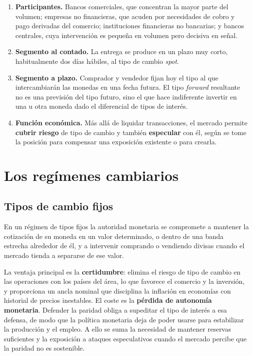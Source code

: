 \begin{enumerate}
    \item \textbf{Participantes.} Bancos comerciales, que concentran la mayor
    parte del volumen; empresas no financieras, que acuden por necesidades de
    cobro y pago derivadas del comercio; instituciones financieras no bancarias;
    y bancos centrales, cuya intervención es pequeña en volumen pero decisiva en
    señal.
    \item \textbf{Segmento al contado.} La entrega se produce en un plazo muy
    corto, habitualmente dos días hábiles, al tipo de cambio \emph{spot}.
    \item \textbf{Segmento a plazo.} Comprador y vendedor fijan hoy el tipo al
    que intercambiarán las monedas en una fecha futura. El tipo \emph{forward}
    resultante no es una previsión del tipo futuro, sino el que hace indiferente
    invertir en una u otra moneda dado el diferencial de tipos de interés.
    \item \textbf{Función económica.} Más allá de liquidar transacciones, el
    mercado permite \textbf{cubrir riesgo} de tipo de cambio y también
    \textbf{especular} con él, según se tome la posición para compensar una
    exposición existente o para crearla.
\end{enumerate}

\section{Los regímenes cambiarios}

\subsection{Tipos de cambio fijos}

En un régimen de tipos fijos la autoridad monetaria se compromete a mantener la
cotización de su moneda en un valor determinado, o dentro de una banda estrecha
alrededor de él, y a intervenir comprando o vendiendo divisas cuando el mercado
tienda a separarse de ese valor.

La ventaja principal es la \textbf{certidumbre}: elimina el riesgo de tipo de
cambio en las operaciones con los países del área, lo que favorece el comercio y
la inversión, y proporciona un ancla nominal que disciplina la inflación en
economías con historial de precios inestables. El coste es la
\textbf{pérdida de autonomía monetaria}. Defender la paridad obliga a supeditar
el tipo de interés a esa defensa, de modo que la política monetaria deja de
poder usarse para estabilizar la producción y el empleo. A ello se suma la
necesidad de mantener reservas suficientes y la exposición a ataques
especulativos cuando el mercado percibe que la paridad no es sostenible.

